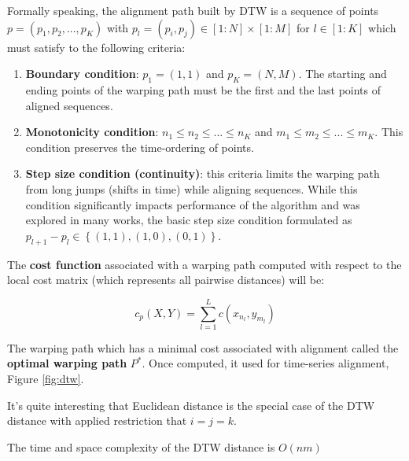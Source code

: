 Formally speaking, the alignment path built by DTW is a sequence of points $p=(p_{1}, p_{2}, ... , p_{K})$ with $p_{l} = (p_{i}, p_{j}) \in [1:N] \times [1:M]$ for $l \in [1:K]$ which must satisfy to the following criteria:
\begin{enumerate}
	\item \textbf{Boundary condition}: $p_{1}=(1,1)$ and $p_{K}=(N,M)$. The starting and ending points of the warping path must be the first and the last points of aligned sequences.
	\item \textbf{Monotonicity condition}: $n_{1} \leq n_{2} \leq ... \leq n_{K}$ and $m_{1} \leq m_{2} \leq ... \leq m_{K}$. This condition preserves the time-ordering of points.
	\item \textbf{Step size condition (continuity)}: this criteria limits the warping path from long jumps (shifts in time) while aligning sequences. While this condition significantly impacts performance of the algorithm and was explored in many works, the basic step size condition formulated as $p_{l+1}-p_{l} \in \left\{ (1,1), (1,0), (0,1) \right\}$.
\end{enumerate}

The \textbf{cost function} associated with a warping path computed with respect to the local cost matrix (which represents all pairwise distances) will be: 

\begin{equation}
\label{eq:pathcost}
c_{p}(X,Y) = \sum_{l=1}^{L} c(x_{n_{l}}, y_{m_{l}})
\end{equation}

The warping path which has a minimal cost associated with alignment called the \textbf{optimal warping path} $P^{*}$. Once computed, it used for time-series alignment, Figure \ref{fig:dtw}.

It's quite interesting that Euclidean distance is the special case of the DTW distance with applied restriction that $i=j=k$.

The time and space complexity of the DTW distance is $O(nm)$
